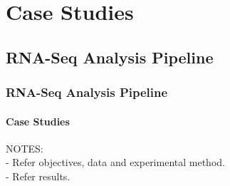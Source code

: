 \documentclass{beamer}
\begin{document}
\begin{frame}


\end{frame}


\section{Case Studies}
\subsection{RNA-Seq Analysis Pipeline}
\begin{frame}
  \frametitle{RNA-Seq Analysis Pipeline}
  \framesubtitle{Case Studies}

NOTES:\\
- Refer objectives, data and experimental method.\\
- Refer results.\\

\end{frame}
\end{document}

